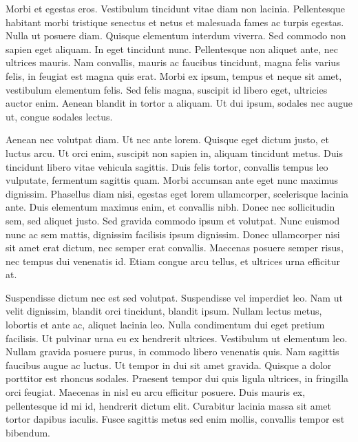 \documentclass[11pt]{article}
\begin{document}
Morbi et egestas eros. Vestibulum tincidunt vitae diam non lacinia. Pellentesque habitant morbi tristique senectus et netus et malesuada fames ac turpis egestas. Nulla ut posuere diam. Quisque elementum interdum viverra. Sed commodo non sapien eget aliquam. In eget tincidunt nunc. Pellentesque non aliquet ante, nec ultrices mauris. Nam convallis, mauris ac faucibus tincidunt, magna felis varius felis, in feugiat est magna quis erat. Morbi ex ipsum, tempus et neque sit amet, vestibulum elementum felis. Sed felis magna, suscipit id libero eget, ultricies auctor enim. Aenean blandit in tortor a aliquam. Ut dui ipsum, sodales nec augue ut, congue sodales lectus.

Aenean nec volutpat diam. Ut nec ante lorem. Quisque eget dictum justo, et luctus arcu. Ut orci enim, suscipit non sapien in, aliquam tincidunt metus. Duis tincidunt libero vitae vehicula sagittis. Duis felis tortor, convallis tempus leo vulputate, fermentum sagittis quam. Morbi accumsan ante eget nunc maximus dignissim. Phasellus diam nisi, egestas eget lorem ullamcorper, scelerisque lacinia ante. Duis elementum maximus enim, et convallis nibh. Donec nec sollicitudin sem, sed aliquet justo. Sed gravida commodo ipsum et volutpat. Nunc euismod nunc ac sem mattis, dignissim facilisis ipsum dignissim. Donec ullamcorper nisi sit amet erat dictum, nec semper erat convallis. Maecenas posuere semper risus, nec tempus dui venenatis id. Etiam congue arcu tellus, et ultrices urna efficitur at.

Suspendisse dictum nec est sed volutpat. Suspendisse vel imperdiet leo. Nam ut velit dignissim, blandit orci tincidunt, blandit ipsum. Nullam lectus metus, lobortis et ante ac, aliquet lacinia leo. Nulla condimentum dui eget pretium facilisis. Ut pulvinar urna eu ex hendrerit ultrices. Vestibulum ut elementum leo. Nullam gravida posuere purus, in commodo libero venenatis quis. Nam sagittis faucibus augue ac luctus. Ut tempor in dui sit amet gravida. Quisque a dolor porttitor est rhoncus sodales. Praesent tempor dui quis ligula ultrices, in fringilla orci feugiat. Maecenas in nisl eu arcu efficitur posuere. Duis mauris ex, pellentesque id mi id, hendrerit dictum elit. Curabitur lacinia massa sit amet tortor dapibus iaculis. Fusce sagittis metus sed enim mollis, convallis tempor est bibendum.
\end{document}

